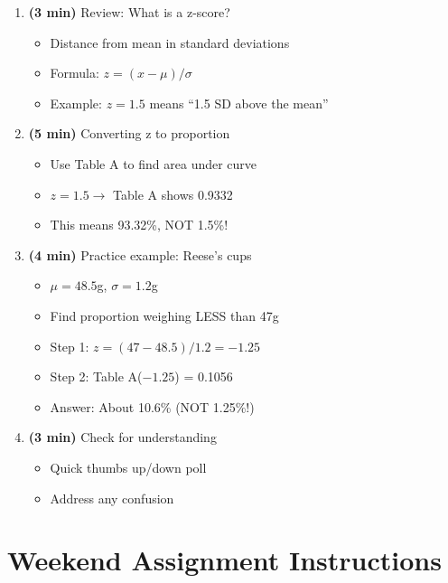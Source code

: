\documentclass[11pt]{article}
\begin{document}
\begin{enumerate}
    \item \textbf{(3 min)} Review: What is a z-score?
    \begin{itemize}
        \item Distance from mean in standard deviations
        \item Formula: $z = (x - \mu) / \sigma$
        \item Example: $z = 1.5$ means ``1.5 SD above the mean''
    \end{itemize}

    \item \textbf{(5 min)} Converting z to proportion
    \begin{itemize}
        \item Use Table A to find area under curve
        \item $z = 1.5 \rightarrow$ Table A shows 0.9332
        \item This means 93.32\%, NOT 1.5\%!
    \end{itemize}

    \item \textbf{(4 min)} Practice example: Reese's cups
    \begin{itemize}
        \item $\mu = 48.5$g, $\sigma = 1.2$g
        \item Find proportion weighing LESS than 47g
        \item Step 1: $z = (47 - 48.5) / 1.2 = -1.25$
        \item Step 2: Table A($-1.25$) = 0.1056
        \item Answer: About 10.6\% (NOT 1.25\%!)
    \end{itemize}

    \item \textbf{(3 min)} Check for understanding
    \begin{itemize}
        \item Quick thumbs up/down poll
        \item Address any confusion
    \end{itemize}
\end{enumerate}

\vspace{0.15in}

\section*{Weekend Assignment Instructions}
\end{document}
